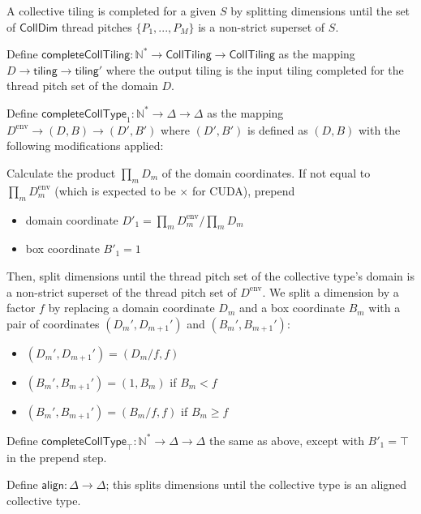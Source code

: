 \filbreak
A collective tiling is completed for a given  $S$ by splitting dimensions until the set of $\mathsf{CollDim}$ thread pitches $\{P_1, ..., P_M\}$ is a non-strict superset of $S$.

\filbreak
Define $\mathsf{completeCollTiling}: \mathbb{N}^* \to \mathsf{CollTiling} \to \mathsf{CollTiling}$ as the mapping $D \to \mathsf{tiling} \to \mathsf{tiling}'$ where the output tiling is the input tiling completed for the thread pitch set of the domain $D$.

\filbreak
{}

Define  $\mathsf{completeCollType}_1: \mathbb{N}^* \to \Delta \to \Delta$ as the mapping $D^\text{env} \to (D, B) \to (D', B')$ where $(D', B')$ is defined as $(D, B)$ with the following modifications applied:

\filbreak
Calculate the product $\prod_m D_m$ of the domain coordinates.
If not equal to $\prod_m D^\text{env}_m$ (which is expected to be  $\times$  for CUDA), prepend
\filbreak
\begin{itemize}
  \item domain coordinate $D'_1 = \prod_m D_m^\text{env} / \prod_m D_m$
  \filbreak
  \item box coordinate $B'_1 = 1$
\end{itemize}
\filbreak
Then, split dimensions until the thread pitch set of the collective type's domain is a non-strict superset of the thread pitch set of $D^\text{env}$.
We split a dimension by a factor $f$ by replacing a domain coordinate $D_m$ and a box coordinate $B_m$ with a pair of coordinates $(D_m', D_{m+1}')$ and $(B_m', B_{m+1}')$:
\begin{itemize}
  \item $(D_m', D_{m+1}') = (D_m / f, f)$
  \filbreak
  \item $(B_m', B_{m+1}') = (1, B_m)$ if $B_m < f$
  \filbreak
  \item $(B_m', B_{m+1}') = (B_m / f, f)$ if $B_m \ge f$
\end{itemize}
\filbreak
Define  $\mathsf{completeCollType}_\top: \mathbb{N}^* \to \Delta \to \Delta$
the same as above, except with $B'_1 = \top$ in the prepend step.

\filbreak
Define $\mathsf{align}: \Delta \to \Delta$; this splits dimensions until the collective type is an aligned collective type.

